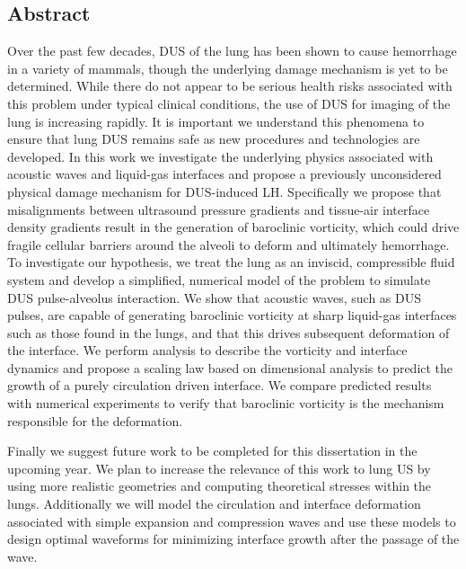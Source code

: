 \subsection{Abstract}
Over the past few decades, \ac{DUS} of the lung has been shown to
cause hemorrhage in a variety of mammals, though the underlying damage
mechanism is yet to be determined. While there do not appear to be
serious health risks associated with this problem under typical
clinical conditions, the use of \ac{DUS} for imaging of the lung is
increasing rapidly. It is important we understand this phenomena to
ensure that lung \ac{DUS} remains safe as new procedures and
technologies are developed. In this work we investigate the underlying
physics associated with acoustic waves and liquid-gas interfaces and
propose a previously unconsidered physical damage mechanism for
\ac{DUS}-induced \ac{LH}. Specifically we propose that misalignments
between ultrasound pressure gradients and tissue-air interface density
gradients result in the generation of baroclinic vorticity, which
could drive fragile cellular barriers around the alveoli to deform and
ultimately hemorrhage. To investigate our hypothesis, we treat the
lung as an inviscid, compressible fluid system and develop a
simplified, numerical model of the problem to simulate \ac{DUS}
pulse-alveolus interaction. We show that acoustic waves, such as
\ac{DUS} pulses, are capable of generating baroclinic vorticity at
sharp liquid-gas interfaces such as those found in the lungs, and that
this drives subsequent deformation of the interface. We perform
analysis to describe the vorticity and interface dynamics and propose
a scaling law based on dimensional analysis to predict the growth of a
purely circulation driven interface. We compare predicted results with
numerical experiments to verify that baroclinic vorticity is the
mechanism responsible for the deformation. 

Finally we suggest future work to be completed for this dissertation
in the upcoming year. We plan to increase the relevance of this work
to lung \ac{US} by using more realistic geometries and computing
theoretical stresses within the lungs. Additionally we will model the
circulation and interface deformation associated with simple expansion
and compression waves and use these models to design optimal waveforms
for minimizing interface growth after the passage of the wave.

